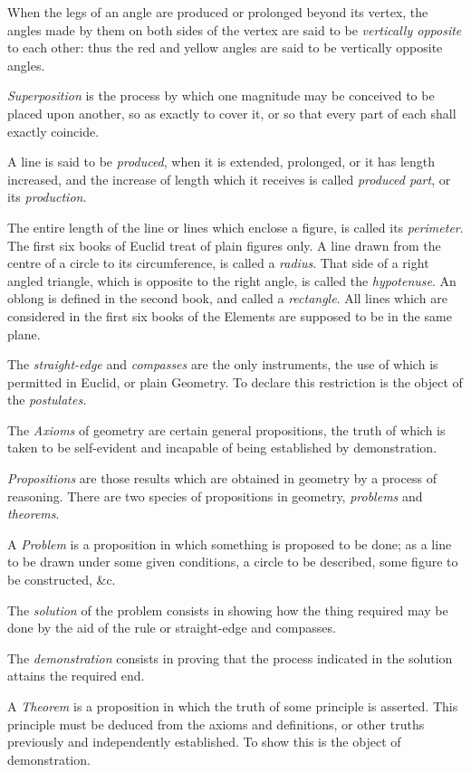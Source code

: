 \documentclass{byrne-book}
\begin{document}
When the legs of an angle are produced or prolonged beyond its vertex, the angles made by them on both sides of the vertex are said to be \emph{vertically opposite} to each other: thus the red and yellow angles are said to be vertically opposite angles.

\emph{Superposition} is the process by which one magnitude may be conceived to be placed upon another, so as exactly to cover it, or so that every part of each shall exactly coincide.

A line is said to be \emph{produced}, when it is extended, prolonged, or it has length increased, and the increase of length which it receives is called \emph{produced part}, or its \emph{production}.

The entire length of the line or lines which enclose a figure, is called its \emph{perimeter}. The first six books of Euclid treat of plain figures only. A line drawn from the centre of a circle to its circumference, is called a \emph{radius}. That side of a right angled triangle, which is opposite to the right angle, is called the \emph{hypotenuse}. An oblong is defined in the second book, and called a \emph{rectangle}. All lines which are considered in the first six books of the Elements are supposed to be in the same plane.

The \emph{straight-edge} and \emph{compasses} are the only instruments, the use of which is permitted in Euclid, or plain Geometry. To declare this restriction is the object of the \emph{postulates.}

The \emph{Axioms} of geometry are certain general propositions, the truth of which is taken to be self-evident and incapable of being established by demonstration.

\emph{Propositions} are those results which are obtained in geometry by a process of reasoning. There are two species of propositions in geometry, \emph{problems} and \emph{theorems}.

A \emph{Problem} is a proposition in which something is proposed to be done; as a line to be drawn under some given conditions, a circle to be described, some figure to be constructed, \&c.

The \emph{solution} of the problem consists in showing how the thing required may be done by the aid of the rule or straight-edge and compasses.

The \emph{demonstration} consists in proving that the process indicated in the solution attains the required end.

A \emph{Theorem} is a proposition in which the truth of some principle is asserted. This principle must be deduced from the axioms and definitions, or other truths previously and independently established. To show this is the object of demonstration.
\end{document}
